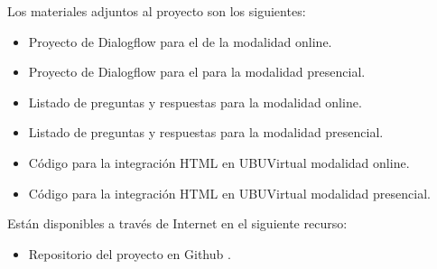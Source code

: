 Los materiales adjuntos al proyecto son los siguientes:

\begin{itemize}
	\tightlist
	\item
	Proyecto de Dialogflow para el  de la modalidad online.
	\item
	Proyecto de Dialogflow para el  para la modalidad presencial.
	\item
	Listado de preguntas y respuestas para la modalidad online.
	\item
	Listado de preguntas y respuestas para la modalidad presencial.
	\item
	Código para la integración HTML en UBUVirtual modalidad online.
	\item
	Código para la integración HTML en UBUVirtual modalidad presencial.

\end{itemize}

Están disponibles a través de Internet en el siguiente recurso:
\begin{itemize}
	\tightlist
	\item
	Repositorio del proyecto en Github \cite{repositorioGithub}.
\end{itemize}




